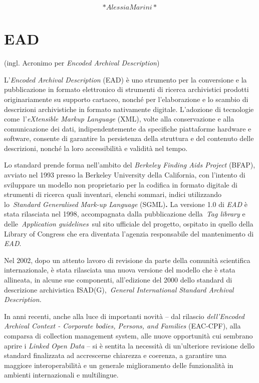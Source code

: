 \documentclass[
  b5paper,
  twoside,
  11pt,
  chapterprefix=false,
  bibliography=totocnumbered,
  parskip=0]{scrbook}
\begin{document}
\[*Alessia Marini*\]

\hypertarget{ead}{%
\chapter{EAD}\label{ead}}

(ingl. Acronimo per \emph{Encoded Archival Description})

L'\emph{Encoded Archival Description} (EAD) è uno strumento per la
conversione e la pubblicazione in formato elettronico di strumenti di
ricerca archivistici prodotti originariamente su supporto cartaceo,
nonché per l'elaborazione e lo scambio di descrizioni archivistiche in
formato nativamente digitale. L'adozione di tecnologie
come~l'\emph{eXtensible Markup Language} (XML), volte alla conservazione e
alla comunicazione dei dati, indipendentemente da specifiche piattaforme
hardware e software, consente di garantire la persistenza della
struttura e del contenuto delle descrizioni, nonché la loro
accessibilità e validità nel tempo.

Lo standard prende forma nell'ambito del \emph{Berkeley Finding Aids
Project} (BFAP), avviato nel 1993 presso la Berkeley University della
California, con l'intento di sviluppare un modello non proprietario per
la codifica in formato digitale di strumenti di ricerca quali inventari,
elenchi sommari, indici utilizzando lo~\emph{Standard Generalised Mark-up
Language} (SGML)\textbf{.} La versione 1.0 di \emph{EAD} è stata rilasciata nel
1998, accompagnata dalla pubblicazione della~\emph{Tag library} e
delle~\emph{Application guidelines}~sul sito ufficiale del progetto, ospitato
in quello della Library of Congress che era diventata l'agenzia
responsabile del mantenimento di \emph{EAD}.

Nel 2002, dopo un attento lavoro di revisione da parte della comunità
scientifica internazionale, è stata rilasciata una nuova versione del
modello che è stata allineata, in alcune sue componenti, all'edizione
del 2000 dello standard di descrizione archivistica ISAD(G),~\emph{General
International Standard Archival Description.}

In anni recenti, anche alla luce di importanti novità -- dal rilascio
\emph{dell'Encoded Archival Context - Corporate bodies, Persons, and
Families} (EAC-CPF), alla comparsa di collection management system, alle
nuove opportunità cui sembrano aprire i \emph{Linked Open Data} -- si è
sentita la necessità di un'ulteriore revisione dello standard
finalizzata ad accrescerne chiarezza e coerenza, a garantire una
maggiore interoperabilità e un generale miglioramento delle funzionalità
in ambienti internazionali e multilingue.
\end{document}
